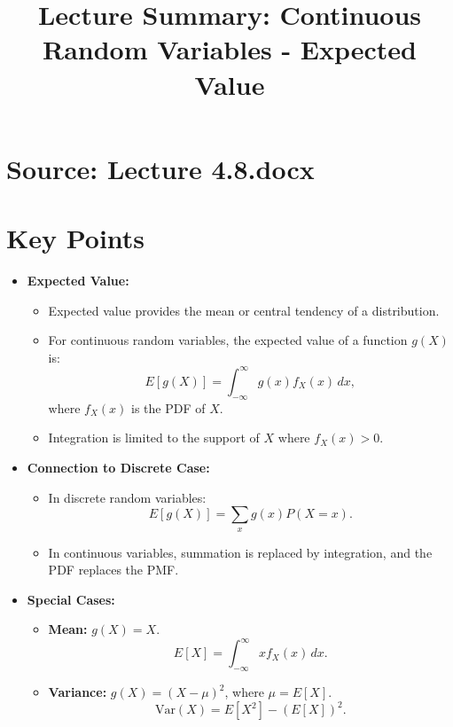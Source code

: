 \documentclass{article}
\title{Lecture Summary: Continuous Random Variables - Expected Value}
\author{}
\date{}
\begin{document}
\maketitle

\section*{Source: Lecture 4.8.docx}

\section*{Key Points}

\begin{itemize}
  \item \textbf{Expected Value:}
    \begin{itemize}
      \item Expected value provides the mean or central tendency of a distribution.
      \item For continuous random variables, the expected value of a function $g(X)$ is:
        \[
          E[g(X)] = \int_{-\infty}^\infty g(x) f_X(x) \, dx,
        \]
        where $f_X(x)$ is the PDF of $X$.
      \item Integration is limited to the support of $X$ where $f_X(x) > 0$.
    \end{itemize}

  \item \textbf{Connection to Discrete Case:}
    \begin{itemize}
      \item In discrete random variables:
        \[
          E[g(X)] = \sum_x g(x) P(X = x).
        \]
      \item In continuous variables, summation is replaced by integration, and the PDF replaces the PMF.
    \end{itemize}

  \item \textbf{Special Cases:}
    \begin{itemize}
      \item \textbf{Mean:} $g(X) = X$.
        \[
          E[X] = \int_{-\infty}^\infty x f_X(x) \, dx.
        \]
      \item \textbf{Variance:} $g(X) = (X - \mu)^2$, where $\mu = E[X]$.
        \[
          \text{Var}(X) = E[X^2] - (E[X])^2.
        \]
    \end{itemize}


\end{itemize}
\end{document}
